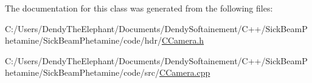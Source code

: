 The documentation for this class was generated from the following files\+:\begin{DoxyCompactItemize}
\item 
C\+:/\+Users/\+Dendy\+The\+Elephant/\+Documents/\+Dendy\+Softainement/\+C++/\+Sick\+Beam\+Phetamine/\+Sick\+Beam\+Phetamine/code/hdr/\hyperlink{_c_camera_8h}{C\+Camera.\+h}\item 
C\+:/\+Users/\+Dendy\+The\+Elephant/\+Documents/\+Dendy\+Softainement/\+C++/\+Sick\+Beam\+Phetamine/\+Sick\+Beam\+Phetamine/code/src/\hyperlink{_c_camera_8cpp}{C\+Camera.\+cpp}\end{DoxyCompactItemize}
